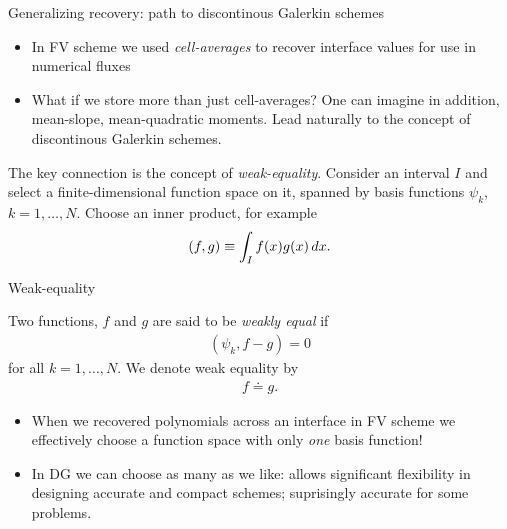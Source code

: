 \documentclass[aspectratio=169]{beamer}
\newcommand{\mypause}{\pause}
\begin{document}
\begin{frame}{Generalizing recovery: path to discontinous Galerkin schemes}
  \begin{itemize}
  \item In FV scheme we used \emph{cell-averages} to recover interface
    values for use in numerical fluxes%
    \mypause%
  \item What if we store more than just cell-averages? One can imagine
    in addition, mean-slope, mean-quadratic moments. Lead naturally to
    the concept of discontinous Galerkin schemes.
  \end{itemize}
  \mypause%
  The key connection is the concept of \emph{weak-equality}. Consider
  an interval $I$ and select a finite-dimensional function space on
  it, spanned by basis functions $\psi_k$, $k=1,\ldots,N$. Choose an
  inner product, for example
  \begin{align*}
    (f, g) \equiv \int_I f(x) g(x) \thinspace dx.
  \end{align*}  
\end{frame}

\begin{frame}{Weak-equality}
  \small
  \begin{definition}
    Two functions, $f$ and $g$ are said to be \emph{weakly equal} if
    \begin{align*}
      (\psi_k,f-g) = 0
    \end{align*}
    for all $k=1,\ldots,N$. We denote weak equality by
    \begin{align*}
      f \doteq g.
    \end{align*}
  \end{definition}  
  \begin{itemize}
  \item When we recovered polynomials across an interface in FV scheme
    we effectively choose a function space with only \emph{one} basis
    function!
  \item In DG we can choose as many as we like: allows significant
    flexibility in designing accurate and compact schemes; suprisingly
    accurate for some problems.
  \end{itemize}
\end{frame}
  
\end{document}
